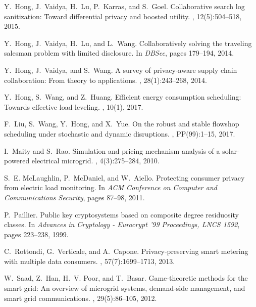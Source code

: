 \documentclass{article}
\begin{document}
\begin{thebibliography}{10}
	Y.~Hong, J.~Vaidya, H.~Lu, P.~Karras, and S.~Goel.
	\newblock Collaborative search log sanitization: Toward differential privacy
	and boosted utility.
	, 12(5):504--518, 2015.
	
	Y.~Hong, J.~Vaidya, H.~Lu, and L.~Wang.
	\newblock Collaboratively solving the traveling salesman problem with limited
	disclosure.
	\newblock In {\em DBSec}, pages 179--194, 2014.
	
	Y.~Hong, J.~Vaidya, and S.~Wang.
	\newblock A survey of privacy-aware supply chain collaboration: From theory to
	applications.
	, 28(1):243--268, 2014.
	
	Y.~Hong, S.~Wang, and Z.~Huang.
	\newblock Efficient energy consumption scheduling: Towards effective load
	leveling.
	, 10(1), 2017.
	
	F.~Liu, S.~Wang, Y.~Hong, and X.~Yue.
	\newblock On the robust and stable flowshop scheduling under stochastic and
	dynamic disruptions.
	, PP(99):1--15,
	2017.
	
	I.~Maity and S.~Rao.
	\newblock Simulation and pricing mechanism analysis of a solar-powered
	electrical microgrid.
	, 4(3):275--284, 2010.
	
	S.~E. McLaughlin, P.~McDaniel, and W.~Aiello.
	\newblock Protecting consumer privacy from electric load monitoring.
	\newblock In {\em ACM Conference on Computer and Communications Security},
	pages 87--98, 2011.
	
	P.~Paillier.
	\newblock Public key cryptosystems based on composite degree residuosity
	classes.
	\newblock In {\em Advances in Cryptology - Eurocrypt '99 Proceedings, LNCS
		1592}, pages 223--238, 1999.
	
	C.~Rottondi, G.~Verticale, and A.~Capone.
	\newblock Privacy-preserving smart metering with multiple data consumers.
	, 57(7):1699--1713, 2013.
	
	W.~Saad, Z.~Han, H.~V. Poor, and T.~Basar.
	\newblock Game-theoretic methods for the smart grid: An overview of microgrid
	systems, demand-side management, and smart grid communications.
	, 29(5):86--105, 2012.
	

\end{thebibliography}
\end{document}
